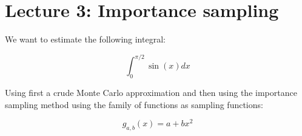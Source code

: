 
\chapter*{Lecture 3: Importance sampling}

We want to estimate the following integral:

$$ \int_0^{\pi/2} \sin(x) dx $$

Using first a crude Monte Carlo approximation and then using the importance sampling method using the family of functions as sampling functions:

$$ g_{a,b}(x) = a+ bx^2 $$